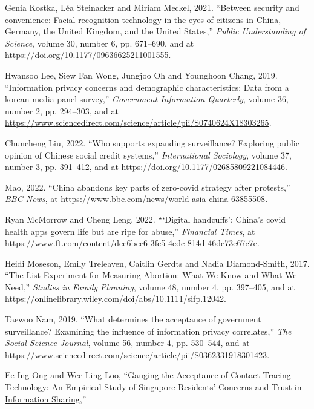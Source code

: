 \documentclass[
  letterpaper,
  DIV=11,
  numbers=noendperiod]{scrartcl}
\newlength{\cslhangindent}
\newenvironment{CSLReferences}[2] %
 {\begin{list}{}{%
  \setlength{\itemindent}{0pt}
  \setlength{\leftmargin}{0pt}
  \setlength{\parsep}{0pt}
  \ifodd #1
   \setlength{\leftmargin}{\cslhangindent}
   \setlength{\itemindent}{-1\cslhangindent}
  \fi
  \setlength{\itemsep}{#2\baselineskip}}}
 {\end{list}}
\begin{document}
\begin{CSLReferences}{1}{1}
Genia Kostka, Léa Steinacker and Miriam Meckel, 2021. {``Between
security and convenience: Facial recognition technology in the eyes of
citizens in China, Germany, the United Kingdom, and the United
States,''} \emph{Public Understanding of Science}, volume 30, number 6,
pp. 671--690, and at \url{https://doi.org/10.1177/09636625211001555}.

Hwansoo Lee, Siew Fan Wong, Jungjoo Oh and Younghoon Chang, 2019.
{``Information privacy concerns and demographic characteristics: Data
from a korean media panel survey,''} \emph{Government Information
Quarterly}, volume 36, number 2, pp. 294--303, and at
\url{https://www.sciencedirect.com/science/article/pii/S0740624X18303265}.

Chuncheng Liu, 2022. {``Who supports expanding surveillance? Exploring
public opinion of Chinese social credit systems,''} \emph{International
Sociology}, volume 37, number 3, pp. 391--412, and at
\url{https://doi.org/10.1177/02685809221084446}.

Mao, 2022. {``China abandons key parts of zero-covid strategy after
protests,''} \emph{BBC News}, at
\url{https://www.bbc.com/news/world-asia-china-63855508}.

Ryan McMorrow and Cheng Leng, 2022. {``{`}Digital handcuffs{'}:
China{'}s covid health apps govern life but are ripe for abuse,''}
\emph{Financial Times}, at
\url{https://www.ft.com/content/dee6bcc6-3fc5-4edc-814d-46dc73e67c7e}.

Heidi Moseson, Emily Treleaven, Caitlin Gerdts and Nadia Diamond-Smith,
2017. {``The List Experiment for Measuring Abortion: What We Know and
What We Need,''} \emph{Studies in Family Planning}, volume 48, number 4,
pp. 397--405, and at
\url{https://onlinelibrary.wiley.com/doi/abs/10.1111/sifp.12042}.

Taewoo Nam, 2019. {``What determines the acceptance of government
surveillance? Examining the influence of information privacy
correlates,''} \emph{The Social Science Journal}, volume 56, number 4,
pp. 530--544, and at
\url{https://www.sciencedirect.com/science/article/pii/S0362331918301423}.

Ee-Ing Ong and Wee Ling Loo,
{``\href{https://doi.org/10.2139/ssrn.3817972}{Gauging the Acceptance of
Contact Tracing Technology: An Empirical Study of Singapore Residents'
Concerns and Trust in Information Sharing},''}


\end{CSLReferences}
\end{document}

